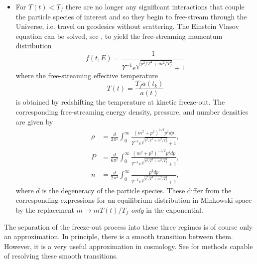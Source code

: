 \documentclass[universe,article,submit,moreauthors,pdftex,a4paper]{Definitions/mdpi}
\begin{document}
\begin{itemize}
\item
For $T(t)<T_f$ there are no longer any significant interactions that couple the particle species of interest and so they begin to free-stream through the Universe, i.e. travel on geodesics without scattering.  The Einstein Vlasov equation can be solved, see \cite{choquet2008general}, to yield the free-streaming momentum distribution
\begin{equation}\label{free_stream_dist}
f(t,E)=\frac{1}{\Upsilon^{-1}e^{\sqrt{p^2/T^2+m^2 /T_f^2}}+ 1}
\end{equation}
where the free-streaming effective temperature
\begin{equation}\label{T_freestream_dist}
T(t)=\frac{T_fa(t_k)}{a(t)}
\end{equation}
is obtained by redshifting the temperature at kinetic freeze-out. The corresponding free-streaming energy density, pressure, and number densities are given by
\begin{align}
\rho&=\frac{d}{2\pi^2}\!\int_0^\infty\!\!\!\frac{\left(m^2+p^2\right)^{1/2}p^2dp }{\Upsilon^{-1}e^{\sqrt{p^2/T^2+m^2/T_f^2}}+ 1},\label{freestream_rho}\\[0.2cm]
P&=\frac{d}{6\pi^2}\!\int_0^\infty\!\!\!\frac{\left(m^2+p^2\right)^{-1/2}p^4dp }{\Upsilon^{-1} e^{\sqrt{p^2/T^2+m^2/T_f^2}}+ 1},\label{freestream_P}\\[0.2cm]
n&=\frac{d}{2\pi^2}\!\int_0^\infty\!\!\!\frac{p^2dp }{\Upsilon^{-1}e^{\sqrt{p^2/T^2+m^2/T_f^2}}+ 1},
\label{num_density}
\end{align}
where $d$ is the degeneracy of the particle species. These differ from the corresponding expressions for an equilibrium distribution in Minkowski space by the replacement $m\rightarrow m T(t)/T_f$  {\em only} in the exponential. 
\end{itemize}
The separation of the freeze-out process into these three regimes is of course only an approximation.  In principle, there is a smooth transition between them.  However, it is a very useful approximation in cosmology.  See \cite{Mangano:2005cc,Birrell:2014gea} for methods capable of resolving these smooth transitions.
\end{document}
